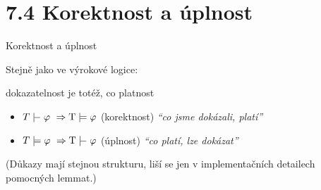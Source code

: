 \documentclass{beamer}
\begin{document}
\section{7.4 Korektnost a úplnost}


\begin{frame}{Korektnost a úplnost}
    
    \pause
    Stejně jako ve výrokové logice:
    
    \pause
    \begin{center}
        \alert{dokazatelnost} je totéž, co \alert{platnost}    
    \end{center}    

    \pause
    \begin{itemize}
        \item \alert{$T\proves\varphi\ \Rightarrow\T\models\varphi$} \hspace{0.5cm} (korektnost) \hfill {\it``co jsme dokázali, platí''}
        \item\alert{$T\models\varphi\ \Rightarrow\T\proves\varphi$}  \hspace{0.5cm} (úplnost) \hfill {\it ``co platí, lze dokázat''}
    \end{itemize} 

    \bigskip

    \pause
    (Důkazy mají stejnou strukturu, liší se jen v implementačních detailech pomocných lemmat.)
 
\end{frame}
\end{document}
